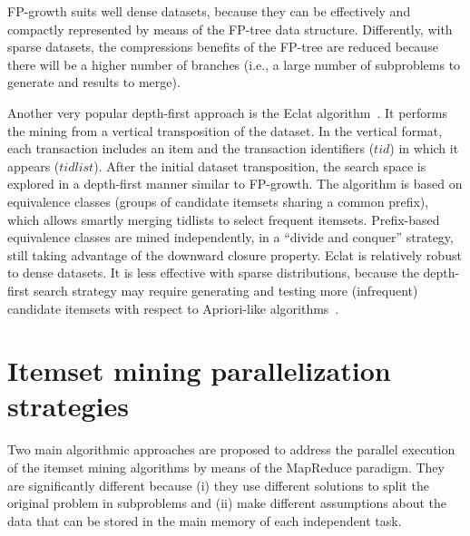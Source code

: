 FP-growth suits well dense datasets, because they can be effectively and compactly represented by means of the FP-tree data structure. Differently, with sparse datasets, the compressions benefits of the FP-tree are reduced because there will be a higher number of branches \cite{Han_2007SurveyFIM} (i.e., a large number of subproblems to generate and results to merge).

Another very popular depth-first approach is the Eclat algorithm~\cite{Zaki97newalgorithms}.
It performs the mining from a vertical
transposition of the dataset. In the vertical format, each transaction includes an item
and the transaction identifiers ($tid$) in which it appears ($tidlist$).
After the initial dataset
transposition, the search space is explored in a depth-first manner similar to
FP-growth. The algorithm is based on equivalence classes (groups of candidate itemsets
sharing a common prefix),  which allows smartly merging tidlists to select frequent itemsets. 
Prefix-based equivalence classes are mined independently, in a ``divide and conquer'' strategy, still
taking advantage of the downward closure property.
Eclat is relatively robust to dense datasets. It is less effective with sparse distributions, because the depth-first search strategy may require
generating and testing more (infrequent) candidate itemsets with respect to Apriori-like algorithms~\cite{vu2012mining}.



\section{Itemset mining parallelization strategies}
\label{survey_parallelization}
Two main algorithmic approaches are proposed to address the parallel execution of the itemset mining algorithms by means of the MapReduce paradigm. 
They are significantly different because (i) they use different solutions to split the original problem in subproblems and (ii) make different assumptions about the data that can be stored in the main memory of each independent task. 

